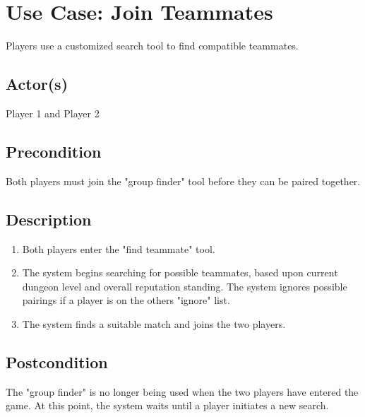 \documentclass[11pt]{article}
\begin{document}
	\section{Use Case: Join Teammates}
		Players use a customized search tool to find compatible teammates. 

		\subsection{Actor(s)}
			
			Player 1 and Player 2

		\subsection{Precondition}
		
			Both players must join the "group finder" tool before they can be paired together. 

		\subsection{Description}
			\begin{enumerate}
			\item Both players enter the "find teammate" tool.
			\item The system begins searching for possible teammates, based upon current dungeon level and overall reputation standing. The system ignores possible pairings if a player is on the others "ignore" list. 
			\item The system finds a suitable match and joins the two players. 
			\end{enumerate}

		\subsection{Postcondition}

			The "group finder" is no longer being used when the two players have entered the game. At this point, the system waits until a player initiates a new search. 
\end{document}
